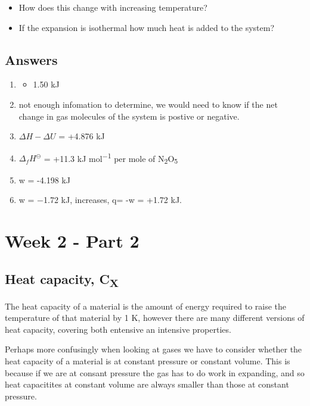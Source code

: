 \documentclass[
]{book}
\providecommand{\tightlist}{%
  \setlength{\itemsep}{0pt}\setlength{\parskip}{0pt}}
\begin{document}
\begin{itemize}
\tightlist
\item
  How does this change with increasing temperature?
\item
  If the expansion is isothermal how much heat is added to the system?
\end{itemize}

\hypertarget{answers-1}{%
\section{Answers}\label{answers-1}}

\begin{enumerate}
\def\labelenumi{\arabic{enumi}.}
\item
  \begin{itemize}
  \tightlist
  \item
    1.50 kJ
  \end{itemize}
\item
  not enough infomation to determine, we would need to know if the net change in gas molecules of the system is postive or negative.
\item
  \(\Delta H - \Delta U\) = +4.876 kJ
\item
  \(Δ_fH^\ominus\) = +11.3 kJ mol\textsuperscript{−1} per mole of N\textsubscript{2}O\textsubscript{5}
\item
  w = -4.198 kJ
\item
  w = −1.72 kJ, increases, q= -w = +1.72 kJ.
\end{enumerate}

\hypertarget{ch:Part4}{%
\chapter{Week 2 - Part 2}\label{ch:Part4}}

\hypertarget{heat-capacity-cx}{%
\section{\texorpdfstring{Heat capacity, C\textsubscript{X}}{Heat capacity, CX}}\label{heat-capacity-cx}}

The heat capacity of a material is the amount of energy required to raise the temperature of that material by 1 K, however there are many different versions of heat capacity, covering both entensive an intensive properties.

Perhaps more confusingly when looking at gases we have to consider whether the heat capacity of a material is at constant pressure or constant volume. This is because if we are at consant pressure the gas has to do work in expanding, and so heat capacitites at constant volume are always smaller than those at constant pressure.
\end{document}
